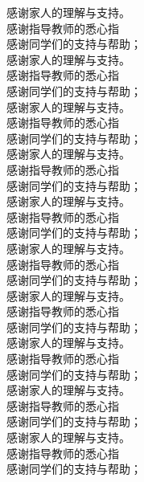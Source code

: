 \documentclass{document}
\begin{document}
\begin{cquacknowledgements}
                     感谢家人的理解与支持。\\
                     感谢指导教师的悉心指\\
                     感谢同学们的支持与帮助；\\
                      感谢家人的理解与支持。\\
                      感谢指导教师的悉心指\\
                      感谢同学们的支持与帮助；\\
                       感谢家人的理解与支持。\\
                       感谢指导教师的悉心指\\
                       感谢同学们的支持与帮助；\\
                        感谢家人的理解与支持。\\
                        感谢指导教师的悉心指\\
                        感谢同学们的支持与帮助；\\
                         感谢家人的理解与支持。\\
                         感谢指导教师的悉心指\\
                         感谢同学们的支持与帮助；\\
                          感谢家人的理解与支持。\\
                          感谢指导教师的悉心指\\
                          感谢同学们的支持与帮助；\\
                           感谢家人的理解与支持。\\
                           感谢指导教师的悉心指\\
                           感谢同学们的支持与帮助；\\
                            感谢家人的理解与支持。\\
                            感谢指导教师的悉心指\\
                            感谢同学们的支持与帮助；\\
                             感谢家人的理解与支持。\\
                             感谢指导教师的悉心指\\
                             感谢同学们的支持与帮助；\\
                              感谢家人的理解与支持。\\
                              感谢指导教师的悉心指\\
                              感谢同学们的支持与帮助；\\

\end{cquacknowledgements}
\end{document}
